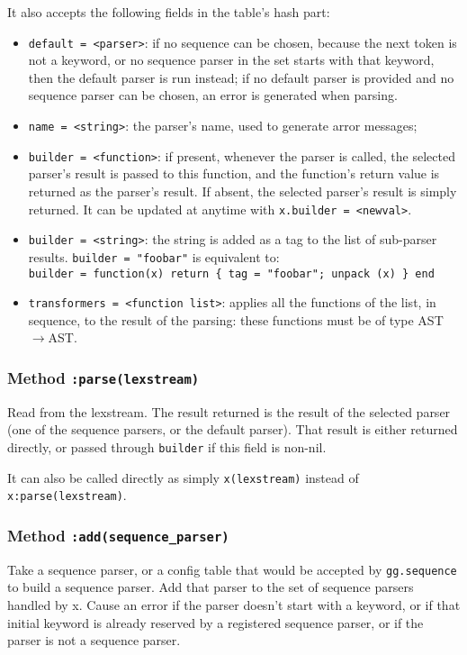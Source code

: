 It also accepts the following fields in the table's hash part:
\begin{itemize}
\item\verb|default = <parser>|: if no sequence can be chosen, because
  the next token is not a keyword, or no sequence parser in the set
  starts with that keyword, then the default parser is run instead; if
  no default parser is provided and no sequence parser can be chosen,
  an error is generated when parsing.
\item\verb|name = <string>|: the parser's name, used to generate arror
  messages;
\item\verb|builder = <function>|: if present, whenever the parser is
  called, the selected parser's result is passed to this
  function, and the function's return value is returned as the
  parser's result. If absent, the selected parser's result is simply
  returned. It can be updated at anytime with
  \verb|x.builder = <newval>|.
\item\verb|builder = <string>|: the string is added as a tag to the
  list of sub-parser results. \verb|builder = "foobar"| is equivalent
  to:\\
 \verb|builder = function(x) return { tag = "foobar"; unpack (x) } end|
\item\verb|transformers = <function list>|: applies all the functions
  of the list, in sequence, to the result of the parsing: these
  functions must be of type AST$\rightarrow$AST.
\end{itemize}

\subsubsection{Method {\tt :parse(lexstream)}}

Read from the lexstream. The result returned is the result of the selected
parser (one of the sequence parsers, or the default parser). That
result is either returned directly, or passed through \verb|builder|
if this field is non-nil.

It can also be called directly as simply \verb|x(lexstream)| instead of
\verb|x:parse(lexstream)|.

\subsubsection{Method {\tt :add(sequence\_parser)}}

Take a sequence parser, or a config table that would be accepted by
\verb|gg.sequence| to build a sequence parser. Add that parser to the
set of sequence parsers handled by x. Cause an error if the parser
doesn't start with a keyword, or if that initial keyword is already
reserved by a registered sequence parser, or if the parser is not a
sequence parser.


